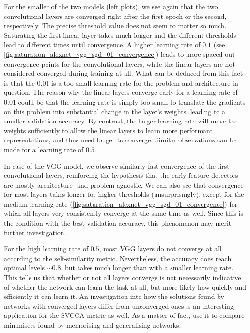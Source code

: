 For the smaller of the two models (left plots), we see again that the two
convolutional layers are converged right after the first epoch or the second,
respectively. The precise threshold value does not seem to matter so much.
Saturating the first linear layer takes much longer and the different thresholds
lead to different times until convergence. A higher learning rate of $0.1$ (see
\cref{fig:saturation_alexnet_vgg_sgd_01_convergence}) leads to more spaced-out
convergence points for the convolutional layers, while the linear layers are not
considered converged during training at all. What can be deduced from this fact
is that the $0.01$ is a too small learning rate for the problem and architecture
in question. The reason why the linear layers converge early for a learning rate
of $0.01$ could be that the learning rate is simply too small to translate the
gradients on this problem into substantial change in the layer's weights,
leading to a smaller validation accuracy. By contrast, the larger learning rate
will move the weights sufficiently to allow the linear layers to learn more
performant representations, and thus need longer to converge. Similar
observations can be made for a learning rate of $0.5$.

In case of the VGG model, we observe similarly fast convergence of the first
convolutional layers, reinforcing the hypothesis that the early feature
detectors are mostly architecture- and problem-agnostic. We can also see that
convergence for most layers takes longer for higher thresholds (unsurprisingly),
except for the medium learning rate
(\cref{fig:saturation_alexnet_vgg_sgd_01_convergence}) for which all layers very
consistently converge at the same time as well. Since this is the condition with
the best validation accuracy, this phenomenon may merit further investigation.

For the high learning rate of $0.5$, most VGG layers do not converge at all
according to the self-similarity metric. Nevertheless, the accuracy does reach
optimal levels $\sim 0.8$, but takes much longer than with a smaller learning
rate. This tells us that whether or not all layers converge is not necessarily
indicative of whether the network can learn the task at all, but more likely how
quickly and efficiently it can learn it. An investigation into how the solutions
found by networks with converged layers differ from unconverged ones is an
interesting application for the SVCCA metric as well. As a matter of fact,
\citet{NIPS2018_7815} use it to compare minimisers found by memorising and
generalising networks.


